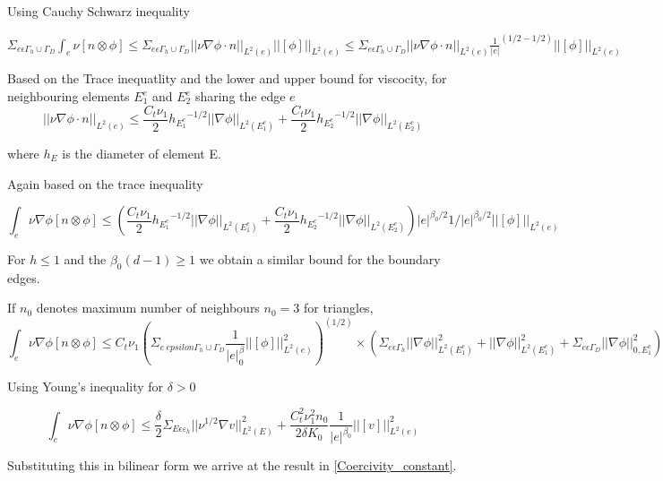 \documentclass[a4paper,12pt]{book}
\begin{document}
Using Cauchy Schwarz inequality

$\Sigma_{e \epsilon \Gamma_h \cup \Gamma_D} \int_e {\nu}[n\otimes \phi] \leq \Sigma_{e \epsilon \Gamma_h \cup \Gamma_D} ||\nu \nabla \phi \cdot n||_{L^2(e)} ||[\phi]||_{L^2(e)} \leq \Sigma_{e \epsilon \Gamma_h \cup \Gamma_D} ||\nu \nabla \phi \cdot n||_{L^2(e)} {\frac{1}{|e|}}^{(1/2-1/2)} ||[\phi]||_{L^2(e)}$

Based on the Trace inequatlity and the lower and upper bound for viscocity, for neighbouring elements $E_1^e$ and $E_2^e$ sharing the edge $e$ 
\begin{equation}
||{\nu \nabla \phi \cdot n}||_{L^2(e)} \leq \frac{C_t \nu_1}{2} {h_{E_1^e}}^{-1/2} ||\nabla \phi||_{L^2(E_1^e)} + \frac{C_t \nu_1}{2} {h_{E_2^e}}^{-1/2} ||\nabla \phi||_{L^2(E_2^e)}
\end{equation}

where $h_E$ is the diameter of element E.

Again based on the trace inequality

\begin{equation}
\int_e {\nu \nabla \phi}[n \otimes \phi] \leq (\frac{C_t \nu_1}{2} {h_{E_1^e}}^{-1/2} ||\nabla \phi||_{L^2(E_1^e)} + \frac{C_t \nu_1}{2} {h_{E_2^e}}^{-1/2} ||\nabla \phi||_{L^2(E_2^e)}) |e|^{\beta_0/2} {1/|e|}^{\beta_0/2} ||[\phi]||_{L^2(e)}
\end{equation}

For $h \leq 1$ and the $\beta_0 (d-1) \geq 1$ we obtain a similar bound for the boundary edges.

If $n_0$ denotes maximum number of neighbours $n_0 = 3$ for triangles,
\begin{equation}
\int_e {\nu \nabla \phi}[n \otimes \phi] \leq C_t \nu_1 (\Sigma_{e \ epsilon \Gamma_h \cup \Gamma_D} \frac{1}{|e|^\beta_0} ||[\phi]||^2_{L^2(e)})^(1/2) \times (\Sigma_{e \epsilon \Gamma_h} ||\nabla \phi||^2_{L^2(E_1^e)} + ||\nabla \phi||^2_{L^2(E_1^e)} + \Sigma_{e \epsilon \Gamma_D} ||\nabla \phi||^2_{0,E_1^e})
\end{equation}

Using Young's inequality for $\delta > 0$

\begin{equation}
\int_e {\nu \nabla \phi}[n \otimes \phi] \leq \frac{\delta}{2} \Sigma_{E \epsilon \varepsilon_h} ||\nu^{1/2} \nabla v ||^2_{L^2(E)} +  \frac{C_t^2 \nu_1^2 n_0}{2 \delta K_0} \frac{1}{|e|^{\beta_0}} ||[v]||^2_{L^2(e)}
\end{equation}


Substituting this in bilinear form we arrive at the result in \ref{Coercivity_constant}.
\end{document}
